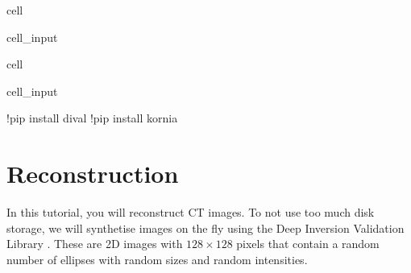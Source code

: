 \documentclass[letterpaper,10pt,english]{jupyterBook}
\begin{document}
\begin{sphinxuseclass}{cell}\begin{sphinxVerbatimInput}

\begin{sphinxuseclass}{cell_input}
\begin{sphinxVerbatim}[commandchars=\\\{\}]
 
 

\PYG{p}{[}\PYG{p}{]}
\end{sphinxVerbatim}

\end{sphinxuseclass}\end{sphinxVerbatimInput}

\end{sphinxuseclass}
\begin{sphinxuseclass}{cell}\begin{sphinxVerbatimInput}

\begin{sphinxuseclass}{cell_input}
\begin{sphinxVerbatim}[commandchars=\\\{\}]
!pip install dival
!pip install kornia
\end{sphinxVerbatim}

\end{sphinxuseclass}\end{sphinxVerbatimInput}

\end{sphinxuseclass}

\section{Reconstruction}
\label{\detokenize{notebooks/Tutorial5_Reconstruction/Tutorial5_Reconstruction_student:reconstruction}}
\sphinxAtStartPar
In this tutorial, you will reconstruct CT images. To not use too much disk storage, we will synthetise images on the fly using the Deep Inversion Validation Library . These are 2D images with \(128\times 128\) pixels that contain a random number of ellipses with random sizes and random intensities.
\end{document}
